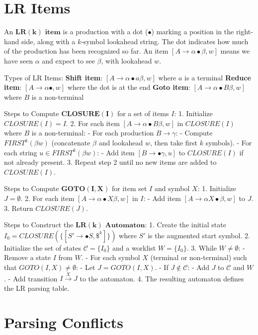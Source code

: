 \section{LR Items}

An $\mathbf{LR(k) \text{ item}}$ is a production with a dot ($\bullet$) marking a position in the right-hand side, along with a $k$-symbol lookahead string. The dot indicates how much of the production has been recognized so far. An item $[A \to \alpha \bullet \beta, w]$ means we have seen $\alpha$ and expect to see $\beta$, with lookahead $w$.

Types of LR Items:
\textbf{Shift item}: $[A \to \alpha \bullet a \beta, w]$ where $a$ is a terminal
\textbf{Reduce item}: $[A \to \alpha \bullet, w]$ where the dot is at the end
\textbf{Goto item}: $[A \to \alpha \bullet B \beta, w]$ where $B$ is a non-terminal

Steps to Compute $\mathbf{CLOSURE(I)}$ for a set of items $I$:
1. Initialize $CLOSURE(I) = I$.
2. For each item $[A \to \alpha \bullet B \beta, w]$ in $CLOSURE(I)$ where $B$ is a non-terminal:
   - For each production $B \to \gamma$:
     - Compute $FIRST^k(\beta w)$ (concatenate $\beta$ and lookahead $w$, then take first $k$ symbols).
     - For each string $u \in FIRST^k(\beta w)$:
       - Add item $[B \to \bullet \gamma, u]$ to $CLOSURE(I)$ if not already present.
3. Repeat step 2 until no new items are added to $CLOSURE(I)$.

Steps to Compute $\mathbf{GOTO(I, X)}$ for item set $I$ and symbol $X$:
1. Initialize $J = \emptyset$.
2. For each item $[A \to \alpha \bullet X \beta, w]$ in $I$:
   - Add item $[A \to \alpha X \bullet \beta, w]$ to $J$.
3. Return $CLOSURE(J)$.

Steps to Construct the $\mathbf{LR(k) \text{ Automaton}}$:
1. Create the initial state $I_0 = CLOSURE(\{[S' \to \bullet S, \$^k]\})$ where $S'$ is the augmented start symbol.
2. Initialize the set of states $\mathcal{C} = \{I_0\}$ and a worklist $W = \{I_0\}$.
3. While $W \neq \emptyset$:
   - Remove a state $I$ from $W$.
   - For each symbol $X$ (terminal or non-terminal) such that $GOTO(I, X) \neq \emptyset$:
     - Let $J = GOTO(I, X)$.
     - If $J \notin \mathcal{C}$:
       - Add $J$ to $\mathcal{C}$ and $W$.
     - Add transition $I \xrightarrow{X} J$ to the automaton.
4. The resulting automaton defines the LR parsing table.




\section{Parsing Conflicts}

